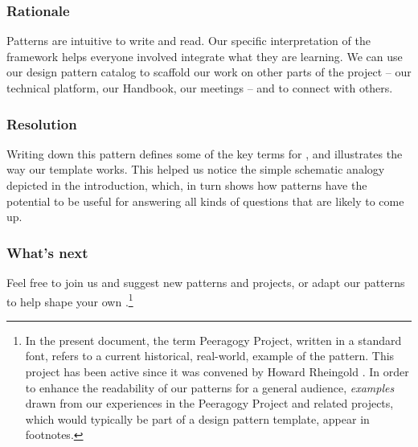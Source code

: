 \subsubsection*{Rationale}
Patterns are intuitive to write and read. Our specific interpretation of the framework helps everyone involved integrate what they are learning.  We can use our design pattern catalog to scaffold our work on other parts of the project -- our technical platform, our Handbook, our meetings -- and to connect with others.  

\subsubsection*{Resolution}  
Writing down this pattern defines some of the key terms for , and illustrates the way our template works.  This helped us notice the simple schematic analogy depicted in the introduction, which, in turn shows how patterns have the potential to be useful for answering all kinds of questions that are likely to come up.

\subsubsection*{What's next} 
Feel free to join us and suggest new patterns and projects, or adapt our patterns to help shape your own .\footnote{In the present document, the term Peeragogy Project, written in a standard font, refers to a current historical, real-world, example of the  pattern. This project has been active since it was convened by Howard Rheingold \cite{howard-rheingold-lecture}. In order to enhance the readability of our patterns for a general audience, \emph{examples} drawn from our experiences in the Peeragogy Project and related projects, which would typically be part of a design pattern template, appear in footnotes.}
